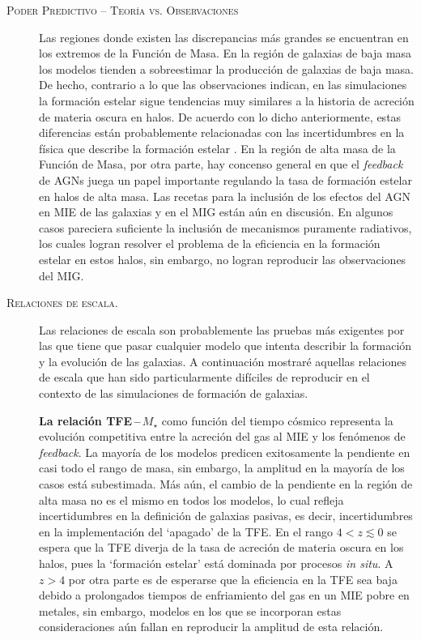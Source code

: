 \documentclass[xcolor=dvipsnames,4pt,hyperref={colorlinks,citecolor=black,linkcolor=black,urlcolor=black}]{beamer}
\begin{document}
\begin{frame}[allowframebreaks]{\textsc{Poder Predictivo -- Teoría vs. Observaciones}}
\begin{description}
Las regiones donde existen las discrepancias más grandes se encuentran en los extremos de la Función
de Masa. En la región de galaxias de baja masa los modelos tienden a sobreestimar la producción de
galaxias de baja masa. De hecho, contrario a lo que las observaciones indican, en las simulaciones
la formación estelar sigue tendencias muy similares a la historia de acreción de materia oscura en
halos. De acuerdo con lo dicho anteriormente, estas diferencias están probablemente relacionadas con
las incertidumbres en la física que describe la formación estelar \citep{McKee2007, Krumholz2014}.
En la región de alta masa de la Función de Masa, por otra parte, hay concenso general en que el
\emph{feedback} de AGNs juega un papel importante regulando la tasa de formación estelar en halos de
alta masa. Las recetas para la inclusión de los efectos del AGN en MIE de las galaxias y en el MIG
están aún en discusión. En algunos casos pareciera suficiente la inclusión de mecanismos puramente
radiativos, los cuales logran resolver el problema de la eficiencia en la formación estelar en estos
halos, sin embargo, no logran reproducir las observaciones del MIG.
%
\item[\textsc{Relaciones de escala.}] Las relaciones de escala son probablemente las pruebas más
exigentes por las que tiene que pasar cualquier modelo que intenta describir la formación y la
evolución de las galaxias. A continuación mostraré aquellas relaciones de escala que han sido
particularmente difíciles de reproducir en el contexto de las simulaciones de formación de galaxias.

\textbf{La relación TFE\,--\,$M_\star$} como función del tiempo cósmico representa la evolución
competitiva entre la acreción del gas al MIE y los fenómenos de \emph{feedback}. La mayoría de los
modelos predicen exitosamente la pendiente en casi todo el rango de masa, sin embargo, la amplitud
en la mayoría de los casos está subestimada. Más aún, el cambio de la pendiente en la región de alta
masa no es el mismo en todos los modelos, lo cual refleja incertidumbres en la definición de
galaxias pasivas, es decir, incertidumbres en la implementación del `apagado' de la TFE. En el rango
$4<z\lesssim0$ se espera que la TFE diverja de la tasa de acreción de materia oscura en los halos,
pues la `formación estelar' está dominada por procesos \emph{in situ}. A $z>4$ por otra parte es de
esperarse que la eficiencia en la TFE sea baja debido a prolongados tiempos de enfriamiento del gas
en un MIE pobre en metales, sin embargo, modelos en los que se incorporan estas consideraciones aún
fallan en reproducir la amplitud de esta relación.


\end{description}
\end{frame}
\end{document}
